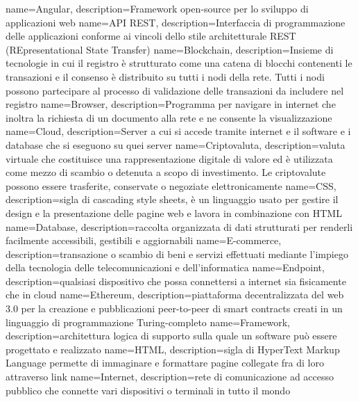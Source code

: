  { name=Angular, description={Framework open-source per lo sviluppo di applicazioni web} }
 { name={API REST}, description={Interfaccia di programmazione delle applicazioni conforme ai vincoli dello stile architetturale REST (REpresentational State Transfer)} }
 { name=Blockchain, description={Insieme di tecnologie in cui il registro è strutturato come una catena di blocchi contenenti le transazioni e il consenso è distribuito su tutti i nodi della rete. Tutti i nodi possono partecipare al processo di validazione delle transazioni da includere nel registro} }
 { name=Browser, description={Programma per navigare in internet che inoltra la richiesta di un documento alla rete e ne consente la visualizzazione} }
 { name={Cloud}, description={Server a cui si accede tramite internet e il software e i database che si eseguono su quei server} }
 { name={Criptovaluta}, description={valuta virtuale che costituisce una rappresentazione digitale di valore ed è utilizzata come mezzo di scambio o detenuta a scopo di investimento. Le criptovalute possono essere trasferite, conservate o negoziate elettronicamente} }
 { name={CSS}, description={sigla di cascading style sheets, è un linguaggio usato per gestire il design e la presentazione delle pagine web e lavora in combinazione con HTML} }
 { name={Database}, description={raccolta organizzata di dati strutturati per renderli facilmente accessibili, gestibili e aggiornabili} }
 { name={E-commerce}, description={transazione o scambio di beni e servizi effettuati mediante l'impiego della tecnologia delle telecomunicazioni e dell'informatica} }
 { name={Endpoint}, description={qualsiasi dispositivo che possa connettersi a internet sia fisicamente che in cloud} }
 { name={Ethereum}, description={piattaforma decentralizzata del web 3.0 per la creazione e pubblicazioni peer-to-peer di smart contracts creati in un linguaggio di programmazione Turing-completo} }
 { name={Framework}, description={architettura logica di supporto sulla quale un software può essere progettato e realizzato} }
 { name={HTML}, description={sigla di HyperText Markup Language permette di immaginare e formattare pagine collegate fra di loro attraverso link} }
 { name={Internet}, description={rete di comunicazione ad accesso pubblico che connette vari dispositivi o terminali in tutto il mondo} }

